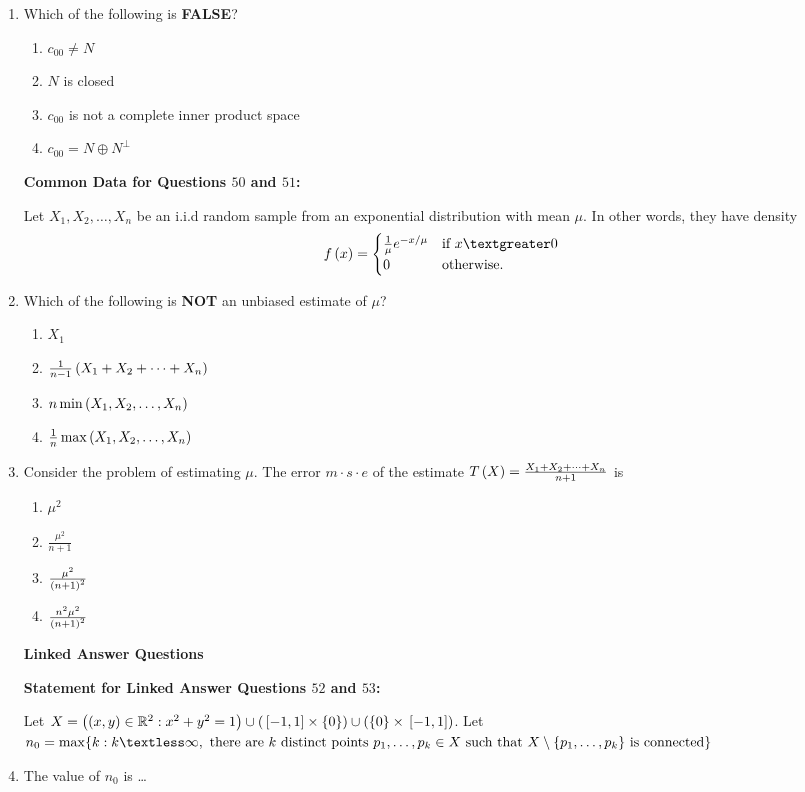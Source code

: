 \documentclass[journal,12pt,twocolumn]{IEEEtran}
\theoremstyle{remark}
\begin{document}
\begin{enumerate}[start=40]
    \item Which of the following is \textbf{FALSE}?
    \begin{enumerate}
        \item $c_{00} \neq N$
        \item $N$ is closed
        \item $c_{00}$ is not a complete inner product space
        \item $c_{00} = N \oplus N^{\perp}$
    \end{enumerate}
\textbf{ Common Data for Questions $50$ and $51$:}

    Let $X_1, X_2, \dots, X_n$ be an i.i.d random sample from an exponential distribution with mean $\mu$. In other words, they have density
    \[
    f \brak{x} = 
    \begin{cases}
      \frac{1}{\mu} e^{-x / \mu} & \text{if } x \textgreater 0 \\
      0 & \text{otherwise}.
    \end{cases}
    \]

    \item Which of the following is \textbf{NOT} an unbiased estimate of $\mu$?
    \begin{enumerate}
        \item $X_1$
        \item $\frac{1}{n-1} \left(X_1 + X_2 + \dots + X_n\right)$
        \item $n  \min \left(X_1, X_2, \dots, X_n\right)$
        \item $\frac{1}{n}  \max \left(X_1, X_2, \dots, X_n\right)$
    \end{enumerate}

    \item Consider the problem of estimating $\mu$. The  error $m \cdot s \cdot e$  of the estimate $T \left(X\right) = \frac{X_1 + X_2 + \dots + X_n}{n + 1}$ is
    \begin{enumerate}
        \item $\mu^2$
        \item $\frac{\mu^2}{n + 1}$
        \item $\frac{ \mu^2}{\left(n + 1\right)^2}$
        \item $\frac{n^2 \mu^2}{\left(n + 1\right)^2}$
    \end{enumerate}

\textbf{ Linked Answer Questions}

   \textbf{ Statement for Linked Answer Questions $52$ and $53$:}

    Let $X = \left(\left(x, y\right) \in \mathbb{R}^2 : x^2 + y^2 = 1\right) \cup \left({}\left[-1, 1\right] \times \{0\}\right) \cup \left(\{0\} \times {}\left[-1, 1\right]\right)$. Let $n_0 = \max \{k : k \textless \infty, \text{ there are } k \text{ distinct points } p_1, \dots, p_k \in X \text{ such that } X \setminus \{p_1, \dots, p_k\} \text{ is connected} \}$

    \item The value of $n_0$ is \dots







 
\end{enumerate}
\end{document}
